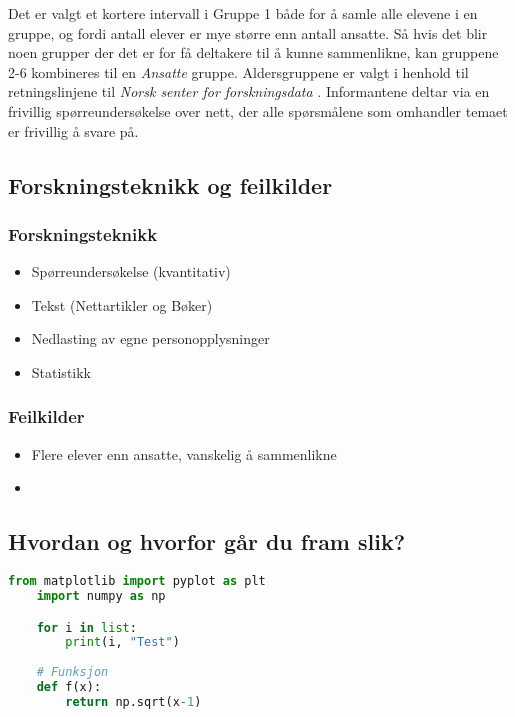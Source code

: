 Det er valgt et kortere intervall i Gruppe 1 både for å samle alle elevene i en gruppe, og fordi antall elever er mye større enn antall ansatte. Så hvis det blir noen grupper der det er for få deltakere til å kunne sammenlikne, kan gruppene 2-6 kombineres til en \textit{Ansatte} gruppe. Aldersgruppene er valgt i henhold til retningslinjene til \textit{Norsk senter for forskningsdata} \parencite{artikkel:nsd_forsknig}. Informantene deltar via en frivillig spørreundersøkelse over nett, der alle spørsmålene som omhandler temaet er frivillig å svare på. 

\subsection{Forskningsteknikk og feilkilder}
\subsubsection{Forskningsteknikk}
\begin{itemize} 
    \item Spørreundersøkelse (kvantitativ)
    \item Tekst (Nettartikler og Bøker)
    \item Nedlasting av egne personopplysninger
    \item Statistikk
\end{itemize}

\subsubsection{Feilkilder}
\begin{itemize}
    \item Flere elever enn ansatte, vanskelig å sammenlikne
    \item 
\end{itemize}

\subsection{Hvordan og hvorfor går du fram slik?}

\begin{lstlisting}[language=Python, caption=Python eksempel]
    from matplotlib import pyplot as plt
    import numpy as np

    for i in list:
        print(i, "Test")
    
    # Funksjon
    def f(x):
        return np.sqrt(x-1)
\end{lstlisting}

\newpage